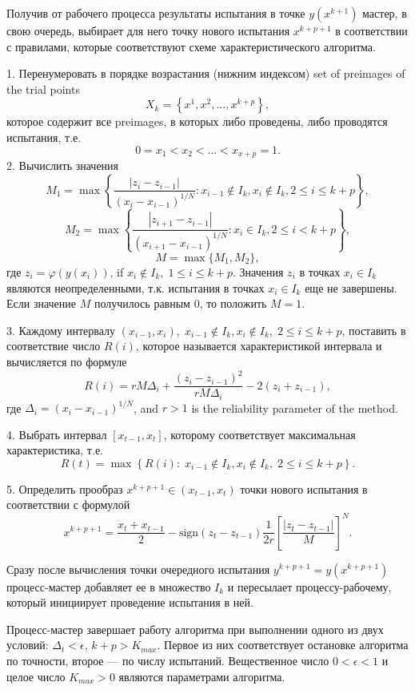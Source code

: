\documentclass{svproc}
\begin{document}
Получив от рабочего процесса результаты испытания в точке $y(x^{k+1})$ мастер, в свою очередь, выбирает для него точку нового испытания $x^{k+p+1}$ в соответствии с правилами, которые соответствуют схеме характеристического алгоритма.

1. Перенумеровать в порядке возрастания (нижним индексом) set of preimages of the trial points 
\[
X_k = \left\{x^1, x^2,...,x^{k+p} \right\},
\]
которое содержит все preimages, в которых либо проведены, либо проводятся испытания, т.е.
\[
0=x_1<x_2<...<x_{x+p}=1.
\]
2. Вычислить значения 
\[
M_1=\max \left\{ \frac{ \left|z_i - z_{i-1} \right|}{(x_i-x_{i-1})^{1/N}} : x_{i-1} \notin I_k, x_i \notin I_k, 2\leq i\leq k+p \right\},
\]
\[
M_2=\max \left\{ \frac{ \left|z_{i+1} - z_{i-1} \right|}{(x_{i+1}-x_{i-1})^{1/N}} : x_i \in I_k, 2\leq i < k+p \right\},
\]
\[
M=\max\{M_1,M_2\},
\]
где $z_i=\varphi(y(x_i))$, if $x_i \notin I_k, \; 1\leq i \leq k+p$. Значения $z_i$ в точках $x_i \in I_k$ являются неопределенными, т.к. испытания в точках $x_i \in I_k$ еще не завершены. Если значение $M$ получилось равным 0, то положить $M=1$.

3. Каждому интервалу $(x_{i-1},x_i), \; x_{i-1} \notin I_k, x_i \notin I_k, \; 2\leq i\leq k+p$, поставить в соответствие число $R(i)$, которое называется характеристикой интервала и вычисляется по формуле
\[
R(i)=rM\Delta_i+\frac{(z_i-z_{i-1})^2}{rM\Delta_i}-2(z_i+z_{i-1}),
\]
где $\Delta_i=\left(x_i-x_{i-1}\right)^{1/N}$, and $r>1$ is the reliability parameter of the method.

4. Выбрать интервал $[x_{t-1},x_t]$, которому соответствует максимальная характеристика, т.е.
\[
R(t) = \max \left\{ R(i): \; x_{i-1} \notin I_k, x_i \notin I_k, \; 2\leq i\leq k+p \right\}.
\]

5. Определить прообраз $x^{k+p+1} \in (x_{t-1},x_t)$ точки нового испытания в соответствии с формулой
\[
x^{k+p+1} = \frac{x_{t}+x_{t-1}}{2} - \mathrm{sign}(z_{t}-z_{t-1})\frac{1}{2r}\left[\frac{\left|z_{t}-z_{t-1}\right|}{M}\right]^N.
\]

Сразу после вычисления точки очередного испытания $y^{k+p+1} = y(x^{k+p+1})$ процесс-мастер добавляет ее в множество $I_k$ и пересылает процессу-рабочему, который инициирует проведение испытания в ней. 

Процесс-мастер завершает работу алгоритма при выполнении одного из двух условий: $\Delta_{t}<\epsilon$, $k+p>K_{max}$.
Первое из них соответствует остановке алгоритма по точности, второе --- по числу испытаний. 
Вещественное число $0<\epsilon<1$ и целое число $K_{max}>0$ являются параметрами алгоритма.
\end{document}
